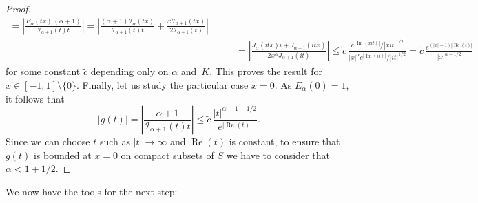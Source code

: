 \documentclass[a4paper]{amsart}
\newcommand{\I}{\mathcal{I}}
\newcommand{\Ea}{E_{\alpha}}
\renewcommand{\Re}{\operatorname{Re}}
\renewcommand{\Im}{\operatorname{Im}}
\theoremstyle{plain}
\theoremstyle{definition}
\theoremstyle{remark}
\numberwithin{equation}{section}
\begin{document}
\begin{proof}
\begin{align*}
= \left| \frac{\Ea(tx)\,(\alpha+1)}{\I_{\alpha+1}(t) t}\right|
= \left| \frac{(\alpha+1) \I_{\alpha}(tx)}{\I_{\alpha+1}(t) t}
+ \frac{x \I_{\alpha+1}(tx)}{2 \I_{\alpha+1}(t)}\right| \\
&\qquad= \left| \frac{J_{\alpha}(itx) i + J_{\alpha+1}(itx)}{2x^{\alpha} J_{\alpha+1}(it)} \right|
\leq \tilde{c} \,\frac{e^{|\Im(xit)|}/|xit|^{1/2}}{|x|^{\alpha}e^{|\Im(it)|}/|it|^{1/2}} 
= \tilde{c} \,\frac{e^{(|x|-1)|\Re(t)|}}{|x|^{\alpha-1/2}}
\end{align*}
for some constant $\tilde{c}$ depending only on $\alpha$ and~$K$.
This proves the result for $x \in [-1,1]\setminus\{ 0 \}$. Finally, let us study the particular case $x=0$. As $\Ea(0) = 1$, it follows that
\[
|g(t)| = \left| \frac{\alpha+1}{\I_{\alpha+1}(t)t}\right| 
\leq \tilde{c} \, \frac{|t|^{\alpha -1 -1/2}}{e^{|\Re(t)|}}.
\]
Since we can choose $t$ such as $|t|\to \infty$ and $\Re(t)$ is constant, to ensure that $g(t)$ is bounded at $x=0$ on compact subsets of $S$ we have to consider that $\alpha < 1+1/2$.
\end{proof}

We now have the tools for the next step:
\end{document}

